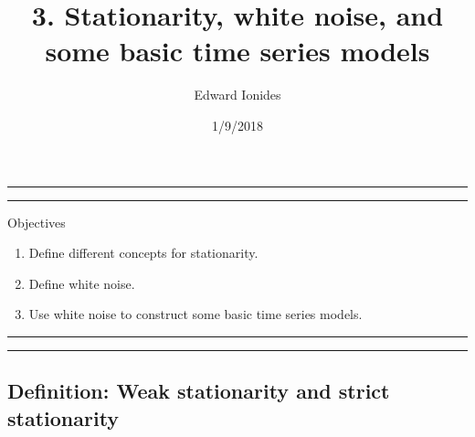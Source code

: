 \documentclass[]{article}
\title{3. Stationarity, white noise, and some basic time series models}
\author{Edward Ionides}
\date{1/9/2018}
\begin{document}
\maketitle

{
\setcounter{tocdepth}{2}
\tableofcontents
}
\newcommand\prob{\mathbb{P}}
\newcommand\E{\mathbb{E}}
\newcommand\var{\mathrm{Var}}
\newcommand\loglik{\ell}
\newcommand\R{\mathbb{R}}
\newcommand\data[1]{#1^*}
\newcommand\given{\, ; \,}
\newcommand\transpose{\scriptsize{T}}





\begin{center}\rule{0.5\linewidth}{\linethickness}\end{center}

\begin{center}\rule{0.5\linewidth}{\linethickness}\end{center}

Objectives

\begin{enumerate}
\def\labelenumi{\arabic{enumi}.}
\item
  Define different concepts for stationarity.
\item
  Define white noise.
\item
  Use white noise to construct some basic time series models.
\end{enumerate}

\begin{center}\rule{0.5\linewidth}{\linethickness}\end{center}

\begin{center}\rule{0.5\linewidth}{\linethickness}\end{center}

\subsection{Definition: Weak stationarity and strict
stationarity}\label{definition-weak-stationarity-and-strict-stationarity}
\end{document}
